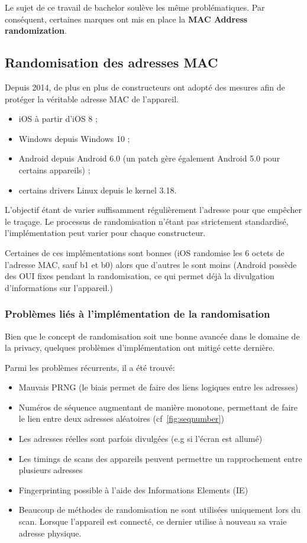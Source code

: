 Le sujet de ce travail de bachelor soulève les même problématiques. Par conséquent, certaines marques
ont mis en place la \textbf{MAC Address randomization}.

\subsection{Randomisation des adresses MAC~\cite{connected:macrandom}}

Depuis 2014, de plus en plus de constructeurs ont adopté des mesures
afin de protéger la véritable adresse MAC de l'appareil. 

\begin{itemize}
    \item iOS à partir d’iOS 8 ;
    \item Windows depuis Windows 10 ;
    \item Android depuis Android 6.0 (un patch gère également Android 5.0 pour certains appareils) ;
    \item certains drivers Linux depuis le kernel 3.18.
\end{itemize}

L'objectif étant de varier suffisamment régulièrement l'adresse pour que empêcher le traçage. 
Le processus de randomisation n'étant pas strictement standardisé, l'implémentation peut varier pour chaque constructeur. 

Certaines de ces implémentations sont bonnes (iOS randomise les 6 octets de l'adresse MAC, sauf b1 et b0) alors que d'autres le sont moins (Android possède des OUI fixes pendant la randomisation, ce qui 
permet déjà la divulgation d'informations sur l'appareil.)

\subsubsection{Problèmes liés à l'implémentation de la randomisation}

Bien que le concept de randomisation soit une bonne avancée dans le domaine de la privacy, quelques
problèmes d'implémentation ont mitigé cette dernière. 

Parmi les problèmes récurrents, il a été trouvé:
\begin{itemize}
	\item Mauvais PRNG (le biais permet de faire des liens logiques entre les adresses)
	\item Numéros de séquence augmentant de manière monotone, permettant de faire le lien entre deux adresses aléatoires (cf~\ref{fig:seqnumber})
	\item Les adresses réelles sont parfois divulgées (e.g si l'écran est allumé)
	\item Les timings de scans des appareils peuvent permettre un rapprochement entre plusieurs adresses
	\item Fingerprinting possible à l'aide des Informations Elements (IE)
	\item Beaucoup de méthodes de randomisation ne sont utilisées uniquement lors du scan. Lorsque l'appareil est connecté, ce dernier utilise à nouveau
	sa vraie adresse physique.
\end{itemize} 

